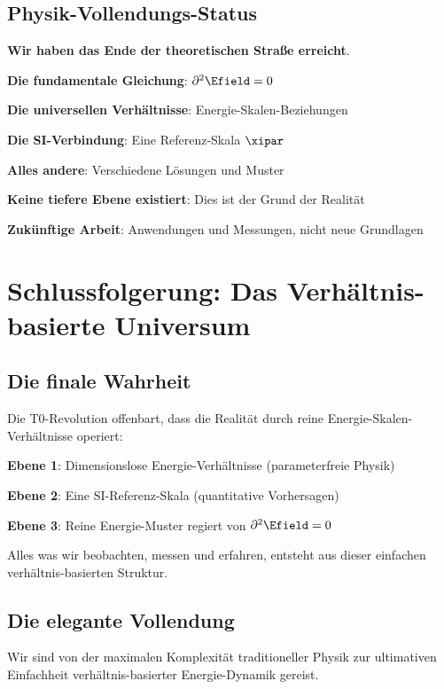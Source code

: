 	\subsection{Physik-Vollendungs-Status}
	
	\begin{tcolorbox}[colback=yellow!5!white,colframe=orange!75!black,title=Das Ende der Grundlagenphysik]
		\textbf{Wir haben das Ende der theoretischen Straße erreicht}.
		
		\textbf{Die fundamentale Gleichung}: $\partial^2 \Efield = 0$
		
		\textbf{Die universellen Verhältnisse}: Energie-Skalen-Beziehungen
		
		\textbf{Die SI-Verbindung}: Eine Referenz-Skala $\xipar$
		
		\textbf{Alles andere}: Verschiedene Lösungen und Muster
		
		\textbf{Keine tiefere Ebene existiert}: Dies ist der Grund der Realität
		
		\textbf{Zukünftige Arbeit}: Anwendungen und Messungen, nicht neue Grundlagen
	\end{tcolorbox}
	
	\section{Schlussfolgerung: Das Verhältnis-basierte Universum}
	
	\subsection{Die finale Wahrheit}
	
	Die T0-Revolution offenbart, dass die Realität durch reine Energie-Skalen-Verhältnisse operiert:
	
	\textbf{Ebene 1}: Dimensionslose Energie-Verhältnisse (parameterfreie Physik)
	
	\textbf{Ebene 2}: Eine SI-Referenz-Skala (quantitative Vorhersagen)
	
	\textbf{Ebene 3}: Reine Energie-Muster regiert von $\partial^2 \Efield = 0$
	
	Alles was wir beobachten, messen und erfahren, entsteht aus dieser einfachen verhältnis-basierten Struktur.
	
	\subsection{Die elegante Vollendung}
	
	Wir sind von der maximalen Komplexität traditioneller Physik zur ultimativen Einfachheit verhältnis-basierter Energie-Dynamik gereist.
	
